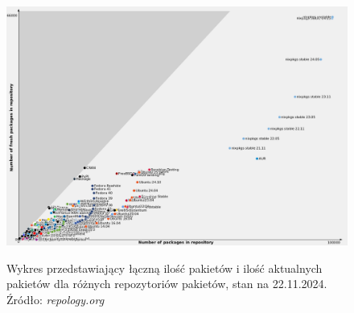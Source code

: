 \begin{figure}[!h]
	\begin{center}
		\resizebox{0.9\textwidth}{!} {
			\includegraphics{img/4/repo.png}
		}
		\caption[Ilość aktualnych pakietów i łączna ilość pakietów w repozytoriach]{Wykres przedstawiający łączną ilość pakietów i ilość aktualnych pakietów dla różnych repozytoriów pakietów, stan na 22.11.2024. Źródło: \textit{repology.org}}
		\label{wykresRepo}
	\end{center}
\end{figure}
